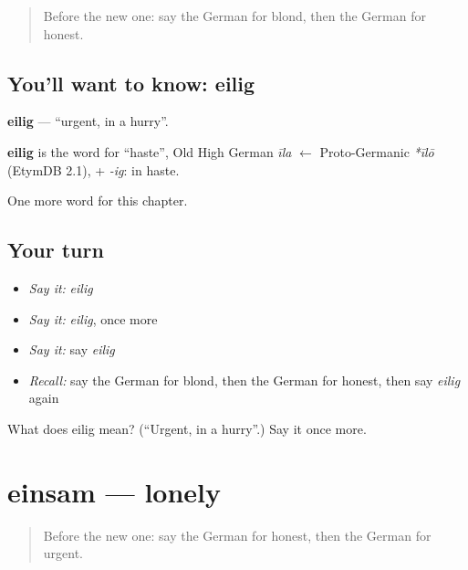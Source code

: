 \label{lesson:GE-C212-eilig}



\begin{quote}
Before the new one: say the German for blond, then the German for honest.
\end{quote}

\subsection*{You'll want to know: eilig}
\textbf{eilig} — \textquotedblleft{}urgent, in a hurry\textquotedblright{}.

\begin{cousinweb}
\textbf{eilig} is the word for \textquotedblleft{}haste\textquotedblright{}, Old High German \emph{īla} $\leftarrow$ Proto-Germanic \emph{*īlō} (EtymDB 2.1), + \emph{-ig}: in haste.
\end{cousinweb}

\begin{grammarlens}[title={What you've built}]
One more word for this chapter.
\end{grammarlens}

\subsection*{Your turn}
\begin{itemize}
\raggedright
  \item \emph{Say it:} \emph{eilig}
  \item \emph{Say it:} \emph{eilig}, once more
  \item \emph{Say it:} say \emph{eilig}
  \item \emph{Recall:} say the German for blond, then the German for honest, then say \emph{eilig} again
\end{itemize}

\begin{tcolorbox}[breakable,colback=teal!4,colframe=teal!35!black,title={Before you move on}]
What does eilig mean? (\textquotedblleft{}Urgent, in a hurry\textquotedblright{}.) Say it once more.
\end{tcolorbox}
\section[einsam]{einsam — lonely}

\label{lesson:GE-C212-einsam}



\begin{quote}
Before the new one: say the German for honest, then the German for urgent.
\end{quote}

